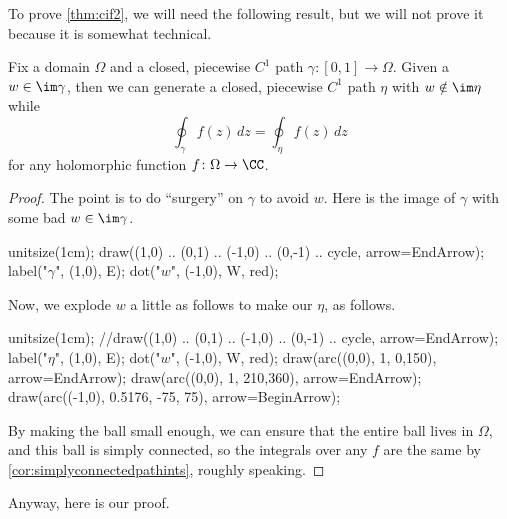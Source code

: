 \documentclass[../notes.tex]{subfiles}
\begin{document}
To prove \autoref{thm:cif2}, we will need the following result, but we will not prove it because it is somewhat technical.
\begin{proposition} \label{prop:surgery}
	Fix a domain $\Omega$ and a closed, piecewise $C^1$ path $\gamma\colon [0,1]\to\Omega$. Given a $w\in\im\gamma$, then we can generate a closed, piecewise $C^1$ path $\eta$ with $w\notin\im\eta$ while
	\[\oint_\gamma f(z)\,dz=\oint_\eta f(z)\,dz\]
	for any holomorphic function $f\colon \Omega\to\CC$.
\end{proposition}
\begin{proof}
	The point is to do ``surgery'' on $\gamma$ to avoid $w$. Here is the image of $\gamma$ with some bad $w\in\im\gamma$.
	\begin{center}
		\begin{asy}
			unitsize(1cm);
			draw((1,0) .. (0,1) .. (-1,0) .. (0,-1) .. cycle, arrow=EndArrow);
			label("$\gamma$", (1,0), E);
			dot("$w$", (-1,0), W, red);
		\end{asy}
	\end{center}
	Now, we explode $w$ a little as follows to make our $\eta$, as follows.
	\begin{center}
		\begin{asy}
			unitsize(1cm);
			//draw((1,0) .. (0,1) .. (-1,0) .. (0,-1) .. cycle, arrow=EndArrow);
			label("$\eta$", (1,0), E);
			dot("$w$", (-1,0), W, red);
			draw(arc((0,0), 1, 0,150), arrow=EndArrow);
			draw(arc((0,0), 1, 210,360), arrow=EndArrow);
			draw(arc((-1,0), 0.5176, -75, 75), arrow=BeginArrow);
		\end{asy}
	\end{center}
	By making the ball small enough, we can ensure that the entire ball lives in $\Omega$, and this ball is simply connected, so the integrals over any $f$ are the same by \autoref{cor:simplyconnectedpathints}, roughly speaking.
\end{proof}
Anyway, here is our proof.
\end{document}
